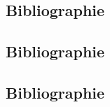 \documentclass{these-dbl}
\begin{document}


\clearpage


\clearpage

\subsection*{Bibliographie}
\printbibliography[heading=none]

\clearemptydoublepage



\clearpage


\clearpage

\subsection*{Bibliographie}
\printbibliography[heading=none]

\clearemptydoublepage



\clearpage


\clearpage

\subsection*{Bibliographie}
\printbibliography[heading=none]

\clearemptydoublepage




\clearemptydoublepage


\backmatter

\clearemptydoublepage
\cleartoevenpage[\thispagestyle{empty}]

\end{document}
